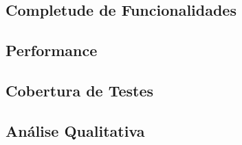 \subsection{Completude de Funcionalidades}


\subsection{Performance}


\subsection{Cobertura de Testes}


\subsection{Análise Qualitativa}


